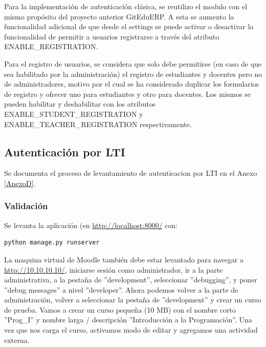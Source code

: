 Para la implementación de autenticación clásica, se reutilizo el modulo con el mismo propósito del proyecto anterior GitEduERP. A esta se aumento la funcionalidad adicional de que desde el settings se puede activar o desactivar la funcionalidad de permitir a usuarios registrarse a través del atributo ENABLE\_REGISTRATION. 

Para el registro de usuarios, se considera que solo debe permitirse (en caso de que sea habilitado por la administración) el registro de estudiantes y docentes pero no de administradores, motivo por el cual se ha considerado duplicar los formularios de registro y ofrecer uno para estudiantes y otro para docentes. Los mismos se pueden habilitar y deshabilitar con los atributos ENABLE\_STUDENT\_REGISTRATION y ENABLE\_TEACHER\_REGISTRATION respectivamente.

\subsection{Autenticación por LTI}
Se documenta el proceso de levantamiento de autenticacion por LTI en el Anexo \ref{AnexoD}.

\subsubsection{Validación}

Se levanta la aplicación (en \url{http://localhost:8000/} con:
\begin{lstlisting}
python manage.py runserver
\end{lstlisting}
La maquina virtual de Moodle también debe estar levantado para navegar a \url{http://10.10.10.10/}, iniciarse sesión como administrador, ir a la parte administrativa, a la pestaña de ''development'', seleccionar ''debugging'', y poner ''debug messages'' a nivel ''developer''. Ahora podemos volver a la parte de administración, volver a seleccionar la pestaña de ''development'' y crear un curso de prueba. Vamos a crear un curso pequeña (10 MB) con el nombre corto ''Prog\_I'' y nombre larga / descripción ''Introducción a la Programación''. Una vez que nos carga el curso, activamos modo de editar y agregamos una actividad externa.

